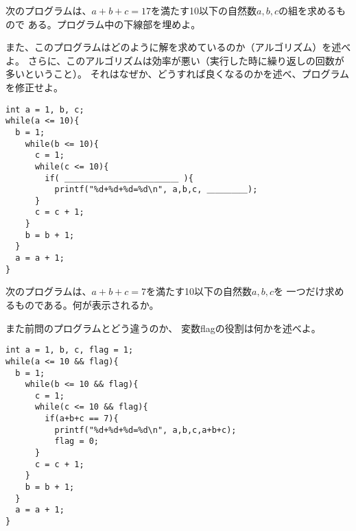 \documentclass[12pt,a4j]{jarticle}
\newcounter{toi}
\def\toi{%
\bigskip\bigskip\noindent
\addtocounter{toi}{1}
\shadowbox{\bfseries\large 問\thetoi}
\nopagebreak[4]\bigskip\nopagebreak[4]
}
\begin{document}
\toi

次のプログラムは、$a+b+c=17$を満たす10以下の自然数$a,b,c$の組を求めるもので
ある。プログラム中の下線部を埋めよ。

また、このプログラムはどのように解を求めているのか（アルゴリズム）を述べよ。
さらに、このアルゴリズムは効率が悪い（実行した時に繰り返しの回数が多いということ）。
それはなぜか、どうすれば良くなるのかを述べ、プログラムを修正せよ。
\begin{verbatim}
int a = 1, b, c;
while(a <= 10){
  b = 1;
    while(b <= 10){
      c = 1;
      while(c <= 10){
        if( ＿＿＿＿＿＿＿＿＿＿＿＿＿＿ ){
          printf("%d+%d+%d=%d\n", a,b,c, ＿＿＿＿＿);
      }
      c = c + 1;
    }
    b = b + 1;
  }
  a = a + 1;
}
\end{verbatim}






\toi

次のプログラムは、$a+b+c=7$を満たす10以下の自然数$a,b,c$を
一つだけ求めるものである。何が表示されるか。

また前問のプログラムとどう違うのか、
変数{\ttfamily flag}の役割は何かを述べよ。
\begin{verbatim}
int a = 1, b, c, flag = 1;
while(a <= 10 && flag){
  b = 1;
    while(b <= 10 && flag){
      c = 1;
      while(c <= 10 && flag){
        if(a+b+c == 7){
          printf("%d+%d+%d=%d\n", a,b,c,a+b+c);
          flag = 0;
      }
      c = c + 1;
    }
    b = b + 1;
  }
  a = a + 1;
}
\end{verbatim}


\end{document}

